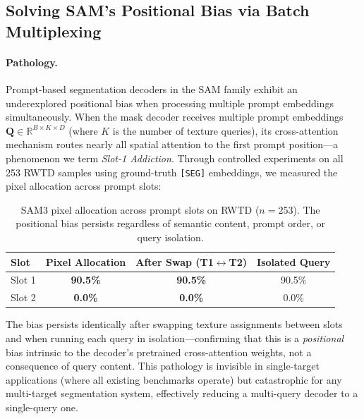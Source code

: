 \documentclass{article}
\begin{document}
\subsection{Solving SAM's Positional Bias via Batch Multiplexing}
\label{sec:slot1}

\paragraph{Pathology.}
Prompt-based segmentation decoders in the SAM family exhibit an underexplored positional bias when processing multiple prompt embeddings simultaneously. When the mask decoder receives multiple prompt embeddings $\mathbf{Q} \in \mathbb{R}^{B \times K \times D}$ (where $K$ is the number of texture queries), its cross-attention mechanism routes nearly all spatial attention to the first prompt position---a phenomenon we term \emph{Slot-1 Addiction}. Through controlled experiments on all 253 RWTD samples using ground-truth \texttt{[SEG]} embeddings, we measured the pixel allocation across prompt slots:

\begin{table}[h]
\centering
\small
\begin{tabular}{lccc}
\toprule
\textbf{Slot} & \textbf{Pixel Allocation} & \textbf{After Swap (T1$\leftrightarrow$T2)} & \textbf{Isolated Query} \\
\midrule
Slot 1 & \textbf{90.5\%} & \textbf{90.5\%} & 90.5\% \\
Slot 2 & \textbf{0.0\%} & \textbf{0.0\%} & 0.0\% \\
\bottomrule
\end{tabular}
\caption{SAM3 pixel allocation across prompt slots on RWTD ($n{=}253$). The positional bias persists regardless of semantic content, prompt order, or query isolation.}
\label{tab:slot1}
\end{table}

The bias persists identically after swapping texture assignments between slots and when running each query in isolation---confirming that this is a \emph{positional} bias intrinsic to the decoder's pretrained cross-attention weights, not a consequence of query content. This pathology is invisible in single-target applications (where all existing benchmarks operate) but catastrophic for any multi-target segmentation system, effectively reducing a multi-query decoder to a single-query one.
\end{document}
